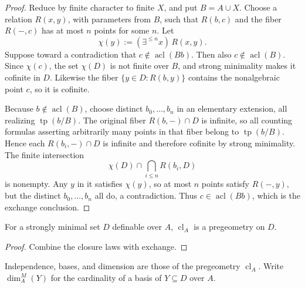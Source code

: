 \begin{proof}
Reduce by finite character to finite \(X\), and put
\(B=A\cup X\).  Choose a relation \(R(x,y)\), with parameters from
\(B\), such that \(R(b,c)\) and the fiber \(R(-,c)\) has at most
\(n\) points for some \(n\).  Let
\[
  \chi(y):=(\exists^{\leq n}x)\,R(x,y).
\]
Suppose toward a contradiction that \(c\notin\operatorname{acl}(Bb)\).
Then also \(c\notin\operatorname{acl}(B)\).  Since \(\chi(c)\), the set
\(\chi(D)\) is not finite over \(B\), and strong minimality makes it
cofinite in \(D\).  Likewise the fiber
\(\{y\in D:R(b,y)\}\) contains the nonalgebraic point \(c\), so it is
cofinite.

Because \(b\notin\operatorname{acl}(B)\), choose distinct
\(b_0,\ldots,b_n\) in an elementary extension, all realizing
\(\operatorname{tp}(b/B)\).  The original fiber \(R(b,-)\cap D\) is
infinite, so all counting formulas asserting arbitrarily many points in
that fiber belong to \(\operatorname{tp}(b/B)\).  Hence each
\(R(b_i,-)\cap D\) is infinite and therefore cofinite by strong
minimality.  The finite intersection
\[
  \chi(D)\cap\bigcap_{i\leq n}R(b_i,D)
\]
is nonempty.  Any \(y\) in it satisfies \(\chi(y)\), so at most \(n\)
points satisfy \(R(-,y)\), but the distinct
\(b_0,\ldots,b_n\) all do, a contradiction.  Thus
\(c\in\operatorname{acl}(Bb)\), which is the exchange conclusion.
\end{proof}

\begin{proposition}
\label{prop:strongly-minimal-pregeometry}
For a strongly minimal set \(D\) definable over \(A\),
\(\operatorname{cl}_A\) is a pregeometry on \(D\).
\end{proposition}

\begin{proof}
Combine the closure laws with exchange.
\end{proof}

\begin{definition}
\label{def:strongly-minimal-independence}
Independence, bases, and dimension are those of the pregeometry
\(\operatorname{cl}_A\).  Write \(\dim_A^M(Y)\) for the cardinality of
a basis of \(Y\subseteq D\) over \(A\).
\end{definition}

